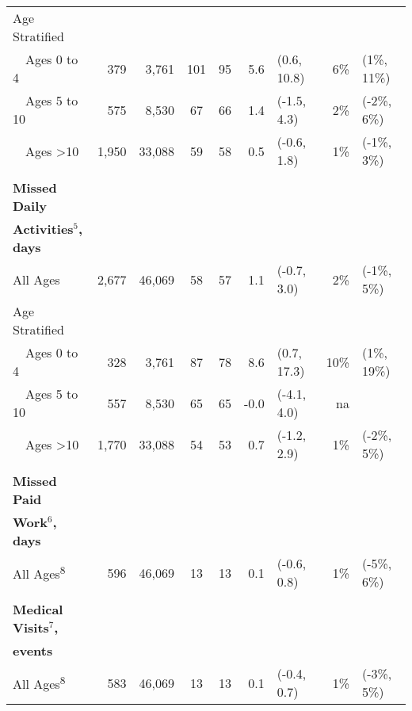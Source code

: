 \documentclass[12pt]{article}\usepackage[]{graphicx}\usepackage[]{color}
\begin{document}
\begin{table}[h!tb]
\begin{footnotesize}
\begin{center}
\begin{tabular}{l rr cc rl rl}
Age Stratified \\
 ~~Ages 0 to 4 & 379 & 3,761 & 101 & 95 & 5.6 & (0.6, 10.8) & 6\% & (1\%, 11\%) \\ 
 ~~Ages 5 to 10 & 575 & 8,530 & 67 & 66 & 1.4 & (-1.5, 4.3) & 2\% & (-2\%, 6\%) \\ 
 ~~Ages >10 & 1,950 & 33,088 & 59 & 58 & 0.5 & (-0.6, 1.8) & 1\% & (-1\%, 3\%) \\ 
  
& \\
\textbf{Missed Daily} \\
\textbf{Activities$^5$, days} \\
 All Ages & 2,677 & 46,069 & 58 & 57 & 1.1 & (-0.7, 3.0) & 2\% & (-1\%, 5\%) \\ 
  
Age Stratified \\
 ~~Ages 0 to 4 & 328 & 3,761 & 87 & 78 & 8.6 & (0.7, 17.3) & 10\% & (1\%, 19\%) \\ 
 ~~Ages 5 to 10 & 557 & 8,530 & 65 & 65 & -0.0 & (-4.1, 4.0) & na &  \\ 
 ~~Ages >10 & 1,770 & 33,088 & 54 & 53 & 0.7 & (-1.2, 2.9) & 1\% & (-2\%, 5\%) \\ 
  
& \\
\textbf{Missed Paid} \\
\textbf{Work$^6$, days} \\
 All Ages\textsuperscript{8} & 596 & 46,069 & 13 & 13 & 0.1 & (-0.6, 0.8) & 1\% & (-5\%, 6\%) \\ 
  
& \\
\textbf{Medical Visits$^7$,} \\
\textbf{events} \\
 All Ages\textsuperscript{8} & 583 & 46,069 & 13 & 13 & 0.1 & (-0.4, 0.7) & 1\% & (-3\%, 5\%) \\ 
  

\end{tabular}
\end{center}
\end{footnotesize}
\end{table}
\end{document}

